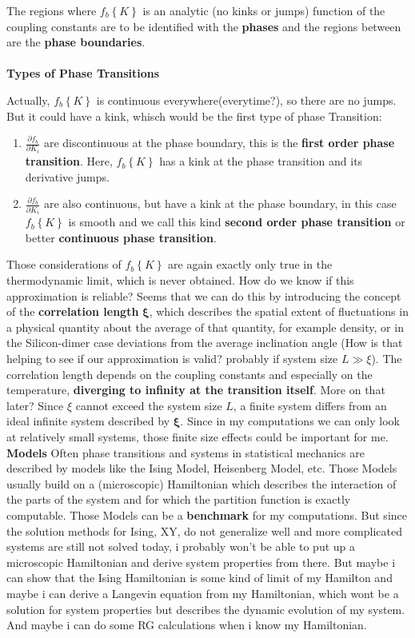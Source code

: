 		The regions where $f_b\left\lbrace K \right\rbrace$ is an analytic (no kinks or jumps) function of the coupling constants are to be identified with the \textbf{phases} and the regions between are the \textbf{phase boundaries}.
		\\
		\\
		\textbf{Types of Phase Transitions}
		
		Actually, $f_b\left\lbrace K \right\rbrace$ is continuous everywhere(everytime?), so there are no jumps. But it could have a kink, whisch would be the first type of phase Transition:
		\begin{enumerate}
			\item $\frac{\partial f_b}{\partial K_i}$ are discontinuous at the phase boundary, this is the \textbf{first order phase transition}. Here, $f_b\left\lbrace K \right\rbrace$ has a kink at the phase transition and its derivative jumps.
			\item $\frac{\partial f_b}{\partial K_i}$ are also continuous, but have a kink at the phase boundary, in this case $f_b\left\lbrace K \right\rbrace$ is smooth and we call this kind \textbf{second order phase transition} or better \textbf{continuous phase transition}.
		\end{enumerate}
		Those considerations of $f_b\left\lbrace K \right\rbrace$ are again exactly only true in the thermodynamic limit, which is never obtained. How do we know if this approximation is reliable? Seems that we can do this by introducing the concept of the \textbf{correlation length} $\boldsymbol{\xi}$, which describes the spatial extent of fluctuations in a physical quantity about the average of that quantity, for example density, or in the Silicon-dimer case deviations from the average inclination angle (How is that helping to see if our approximation is valid? probably if system size $ L \gg \xi$). The correlation length depends on the coupling constants and especially on the temperature, \textbf{diverging to infinity at the transition itself}. More on that later? Since $\xi$ cannot exceed the system size $L$, a finite system differs from an ideal infinite system described by $\boldsymbol{\xi}$. Since in my computations we can only look at relatively small systems, those finite size effects could be important for me.
		\newline
		\newline
		\textbf{Models}
		Often phase transitions and systems in statistical mechanics are described by models like the Ising Model, Heisenberg Model, etc. Those Models usually build on a (microscopic) Hamiltonian which describes the interaction of the parts of the system and for which the partition function is exactly computable. Those Models can be a \textbf{benchmark} for my computations. But since the solution methods for Ising, XY, do not generalize well and more complicated systems are still not solved today, i probably won't be able to put up a microscopic Hamiltonian and derive system properties from there. But maybe i can show that the Ising Hamiltonian is some kind of limit of my Hamilton and maybe i can derive a Langevin equation from my Hamiltonian, which wont be a solution for system properties but describes the dynamic evolution of my system. And maybe i can do some RG calculations when i know my Hamiltonian.  
